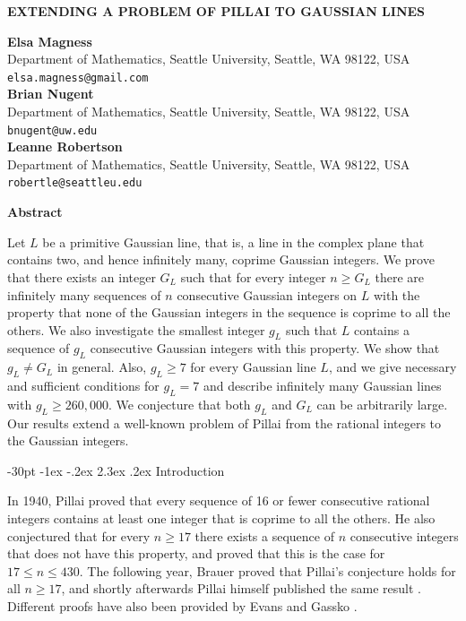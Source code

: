 \documentclass[11pt]{article}
\makeatletter
\renewcommand\section{\@startsection {section}{1}{\z@}
{-30pt \@plus -1ex \@minus -.2ex}
{2.3ex \@plus.2ex}
{\normalfont\normalsize\bfseries\boldmath}}
\makeatother
\begin{document}
\begin{center}
\uppercase{\bf Extending a problem of Pillai to Gaussian lines}

\vskip 20pt
{\bf Elsa Magness
}\\
{\smallit Department of Mathematics, Seattle University, Seattle, WA 98122, USA}\\
{\tt elsa.magness@gmail.com}\\
\vskip 10pt
{\bf Brian Nugent
}\\
{\smallit Department of Mathematics, Seattle University, Seattle, WA 98122, USA}\\
{\tt bnugent@uw.edu}\\ 
\vskip 10pt
{\bf Leanne Robertson}\\
{\smallit Department of Mathematics, Seattle University, Seattle, WA 98122, USA}\\
{\tt robertle@seattleu.edu}\\ 
\end{center}
\vskip 20pt

\centerline{\bf Abstract}


 Let $L$ be a primitive Gaussian line, that is, a line in the complex plane that contains two, and hence infinitely many, coprime Gaussian integers. 
We prove that there exists an integer $G_L$ such that for every integer $n\geq G_L$ there are infinitely many sequences of $n$ consecutive Gaussian integers on $L$ with the property that none of the Gaussian integers in the sequence is coprime to all  the others.  We also investigate the smallest integer $g_L$ such that $L$ contains a  sequence of $g_L$ consecutive Gaussian integers with this property.  We show that $g_L\neq G_L$ in general.  Also, $g_L\geq 7$ for every Gaussian line  $L$, and we give necessary and sufficient conditions for $g_L=7$ and describe infinitely many Gaussian lines with $g_L\geq 260,000$.  We conjecture that both $g_L$ and $G_L$ can be arbitrarily large. Our results extend a well-known problem of Pillai from the rational integers to the Gaussian integers.



\section{Introduction}\label{intro}

In 1940, Pillai \cite{pillai1} proved that every  sequence  of
16 or fewer  consecutive rational integers contains at least one integer  that
is coprime  to  all  the  others. He also conjectured that for every $n\geq 17$ there exists a sequence of $n$ consecutive integers that does not have this property, and proved that this is the case for $17\leq n\leq430$.  The following year, Brauer \cite{brauer}  proved that Pillai's conjecture holds for all $n\geq 17$, and shortly afterwards Pillai himself published the same result \cite{pillai2}.  
Different proofs have also been provided by Evans \cite{evans1} and Gassko \cite{gassko}.
\end{document}
